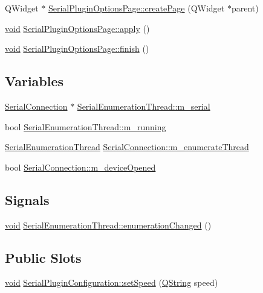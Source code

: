 \begin{DoxyCompactItemize}
\item 
Q\-Widget $\ast$ \hyperlink{group___serial_plugin_ga77331da48998f8e92c60751f5e2ab862}{Serial\-Plugin\-Options\-Page\-::create\-Page} (Q\-Widget $\ast$parent)
\item 
\hyperlink{group___u_a_v_objects_plugin_ga444cf2ff3f0ecbe028adce838d373f5c}{void} \hyperlink{group___serial_plugin_ga442981f9537c634cbc6bd160f30c0a8a}{Serial\-Plugin\-Options\-Page\-::apply} ()
\item 
\hyperlink{group___u_a_v_objects_plugin_ga444cf2ff3f0ecbe028adce838d373f5c}{void} \hyperlink{group___serial_plugin_ga7d5463f2125597e0962512fde1cd83e4}{Serial\-Plugin\-Options\-Page\-::finish} ()
\end{DoxyCompactItemize}
\subsection*{Variables}
\begin{DoxyCompactItemize}
\item 
\hyperlink{class_serial_connection}{Serial\-Connection} $\ast$ \hyperlink{group___serial_plugin_ga5f88185588c5c33293dad0342be60237}{Serial\-Enumeration\-Thread\-::m\-\_\-serial}
\item 
bool \hyperlink{group___serial_plugin_ga1b3398189b91a1994544370f00f8cd00}{Serial\-Enumeration\-Thread\-::m\-\_\-running}
\item 
\hyperlink{class_serial_enumeration_thread}{Serial\-Enumeration\-Thread} \hyperlink{group___serial_plugin_ga5895d83033636cc3832bd9478f4415f7}{Serial\-Connection\-::m\-\_\-enumerate\-Thread}
\item 
bool \hyperlink{group___serial_plugin_gac430f3139892f313e094560f5e2e72d1}{Serial\-Connection\-::m\-\_\-device\-Opened}
\end{DoxyCompactItemize}
\subsection*{Signals}
\begin{DoxyCompactItemize}
\item 
\hyperlink{group___u_a_v_objects_plugin_ga444cf2ff3f0ecbe028adce838d373f5c}{void} \hyperlink{group___serial_plugin_ga18ace5d92ca2899dc35a0fa3b43e016a}{Serial\-Enumeration\-Thread\-::enumeration\-Changed} ()
\end{DoxyCompactItemize}
\subsection*{Public Slots}
\begin{DoxyCompactItemize}
\item 
\hyperlink{group___u_a_v_objects_plugin_ga444cf2ff3f0ecbe028adce838d373f5c}{void} \hyperlink{group___serial_plugin_ga6e476e94e24bb1f9bf91de3c99ff00fc}{Serial\-Plugin\-Configuration\-::set\-Speed} (\hyperlink{group___u_a_v_objects_plugin_gab9d252f49c333c94a72f97ce3105a32d}{Q\-String} speed)
\end{DoxyCompactItemize}
